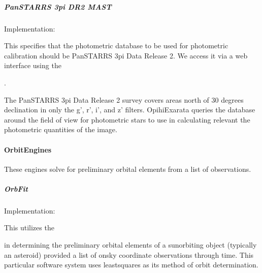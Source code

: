 \documentclass[letterpaper,11pt,english]{sphinxmanual}
\begin{document}
\subparagraph{Pan\sphinxhyphen{}STARRS 3pi DR2 MAST}
\label{\detokenize{technical/architecture/services_engines:pan-starrs-3pi-dr2-mast}}
\sphinxAtStartPar
Implementation: {\hyperref[\detokenize{code/opihiexarata.photometry.panstarrs:opihiexarata.photometry.panstarrs.PanstarrsMastWebAPIEngine}]{}}

\sphinxAtStartPar
This specifies that the photometric database to be used for photometric
calibration should be Pan\sphinxhyphen{}STARRS 3pi Data Release 2. We access it via a web
interface using the
%
\begin{footnote}[44]\sphinxAtStartFootnote
{}
%
\end{footnote}.

\sphinxAtStartPar
The Pan\sphinxhyphen{}STARRS 3pi Data Release 2 survey covers areas north of \sphinxhyphen{}30
degrees declination in only the g’, r’, i’, and z’ filters. OpihiExarata
queries the database around the field of view for photometric stars to use in
calculating relevant the photometric quantities of the image.


\paragraph{OrbitEngines}
\label{\detokenize{technical/architecture/services_engines:orbitengines}}\label{\detokenize{technical/architecture/services_engines:technical-architecture-services-engines-orbitengines}}
\sphinxAtStartPar
These engines solve for preliminary orbital elements from a list of
observations.


\subparagraph{OrbFit}
\label{\detokenize{technical/architecture/services_engines:orbfit}}
\sphinxAtStartPar
Implementation: {\hyperref[\detokenize{code/opihiexarata.orbit.orbfit:opihiexarata.orbit.orbfit.OrbfitOrbitDeterminerEngine}]{}}

\sphinxAtStartPar
This utilizes the %
\begin{footnote}[45]\sphinxAtStartFootnote
{}
%
\end{footnote}
in determining the preliminary orbital elements of a sun\sphinxhyphen{}orbiting object
(typically an asteroid) provided a list of on\sphinxhyphen{}sky coordinate observations
through time. This particular software system uses least\sphinxhyphen{}squares as its method
of orbit determination.
\end{document}
